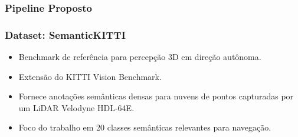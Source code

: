 \documentclass[aspectratio=169,t,xcolor=table]{beamer}
\begin{document}
\begin{frame}
    \frametitle{Pipeline Proposto}
    \begin{figure}
        \centering
    \end{figure}
\end{frame}

\begin{frame}
    \frametitle{Dataset: SemanticKITTI}
    \begin{itemize}
        \item<+-> Benchmark de referência para percepção 3D em direção autônoma.
        \item<+-> Extensão do KITTI Vision Benchmark.
        \item<+-> Fornece anotações semânticas densas para nuvens de pontos
              capturadas por um LiDAR Velodyne HDL-64E.
        \item<+-> Foco do trabalho em 20 classes semânticas relevantes para
              navegação.
    \end{itemize}
\end{frame}
\end{document}
